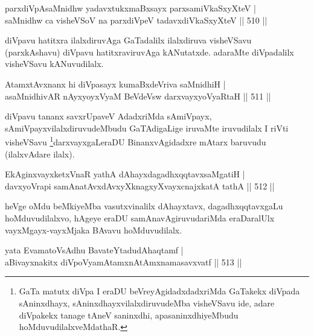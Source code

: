 
\begin{shl}
parxdiVpAsaMnidhw yadavxtukxmaBxsayx parxsamiVkaSxyXteV | \\
saMnidhw ca visheVSoV na parxdiVpeV tadavxdiVkaSxyXteV \hfill||  510 || 
\end{shl}

\begin{artha}
diVpavu hatitxra ilalxdiruvAga GaTadalilx ilalxdiruva visheVSavu (parxkAshavu) diVpavu hatitxraviruvAga kANutatxde. adaraMte diVpadalilx visheVSavu kANuvudilalx.
\end{artha}


\begin{shl}
AtamxtAvxnanx hi diVpasayx kumaBxdeVriva saMnidhiH | \\
asaMnidhivAR nAyxyoyxV\s yaM BeVdeV\s sw darxvayxyoVyaRtaH \hfill||  511 ||  
\end{shl}

\begin{artha}
diVpavu tananx savxrUpaveV AdadxriMda sAmiVpayx, sAmiVpayxvilalxdiruvudeMbudu GaTAdigaLige iruvaMte iruvudilalx I riVti visheVSavu \footnote[1]{GaTa matutx diVpa I eraDU beVreyAgidadxdadxriMda GaTakekx diVpada sAninxdhayx, sAninxdhayxvilalxdiruvudeMba visheVSavu ide, adare diVpakekx tanage tAneV saninxdhi, apasaninxdhiyeMbudu hoMduvudilalxveMdathaR.}darxvayxgaLeraDU BinanxvAgidadxre mAtarx baruvudu (ilalxvAdare ilalx).
\end{artha}


\begin{shl}
EkAginxvayxketxVnaR yathA dAhayxdagadhxqqtavxsaMgatiH | \\
davxyoVrapi samAnatAvxdAvxyXknagxyXvayxcnajxkatA tathA \hfill||  512 ||  
\end{shl}

\begin{artha}
heVge oMdu beMkiyeMba vasutxvinalilx dAhayxtavx, dagadhxqqtavxgaLu hoMduvudilalxvo, hAgeye eraDU samAnavAgiruvudariMda eraDaralUlx vayxMgayx-vayxMjaka BAvavu hoMduvudilalx. 
\end{artha}

\begin{shl}
yata EvamatoV\s sAdhu BavateYtadudAhaqtamf | \\
aBivayxnakitx diVpoV\s yamAtamxnA\s \s tAmxnamasavxvatf \hfill||  513 ||  
\end{shl}

